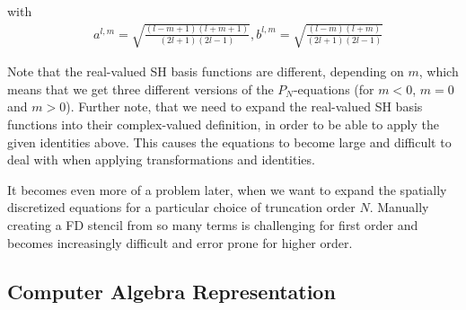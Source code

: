 with 
\begin{align}
&a^{l,m}= \sqrt{\frac{\left(l-m+1\right)\left(l+m+1\right)}{\left(2l+1\right)\left(2l-1\right)}},
b^{l,m}= \sqrt{\frac{\left(l-m\right)\left(l+m\right)}{\left(2l+1\right)\left(2l-1\right)}}
\end{align}




Note that the real-valued SH basis functions are different, depending on $m$, which means that we get three different versions of the $P_N$-equations (for $m<0$, $m=0$ and $m>0$). Further note, that we need to expand the real-valued SH basis functions into their complex-valued definition, in order to be able to apply the given identities above. This causes the equations to become large and difficult to deal with when applying transformations and identities.

It becomes even more of a problem later, when we want to expand the spatially discretized equations for a particular choice of truncation order $N$. Manually creating a FD stencil from so many terms is challenging for first order and becomes increasingly difficult and error prone for higher order.

\subsection*{Computer Algebra Representation}

\begin{figure}[h]
\centering
\begin{subfigure}{0.45\columnwidth}
\end{subfigure}%
\hspace{0.05\columnwidth}
\begin{subfigure}{0.45\columnwidth}
\end{subfigure}%

\begin{subfigure}{0.45\columnwidth}
\end{subfigure}%
\hspace{0.05\columnwidth}
\begin{subfigure}{0.45\columnwidth}
\end{subfigure}%

\end{figure}

